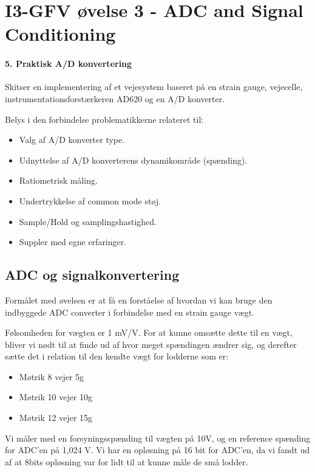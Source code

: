 \documentclass[a4paper, 11pt, articel,oneside,openany]{memoir} %
\begin{document}
	
\chapter*{I3-GFV øvelse 3 - ADC and Signal Conditioning}

\subsubsection{5. Praktisk A/D konvertering}
Skitser en implementering af et vejesystem baseret på en strain gauge, vejecelle, instrumentationsforstærkeren AD620 og en A/D konverter.

Belys i den forbindelse problematikkerne relateret til:
\begin{itemize}
	\item Valg af A/D konverter type.
	\item Udnyttelse af A/D konverterens dynamikområde (spænding).
	\item Ratiometrisk måling.
	\item Undertrykkelse af common mode støj.
	\item Sample/Hold og samplingshastighed.
	\item Suppler med egne erfaringer.
\end{itemize}




\section{ADC og signalkonvertering}

Formålet med øvelsen er at få en forståelse af hvordan vi kan bruge den indbyggede ADC converter i forbindelse med en strain gauge vægt.

Følsomheden for vægten er 1 mV/V. For at kunne omsætte dette til en vægt, bliver vi nødt til at finde ud af hvor meget spændingen ændrer sig, og derefter sætte det i relation til den kendte vægt for lodderne som er:

\begin{itemize}

	\item Møtrik 8 vejer 5g
	\item Møtrik 10 vejer 10g
	\item Møtrik 12 vejer 15g
	
\end{itemize}


Vi måler med en forsyningsspænding til vægten på 10V, og en reference spænding for ADC'en på 1,024 V.
Vi har en opløsning på 16 bit for ADC'en, da vi fandt ud af at 8bits opløsning var for lidt til at kunne måle de små lodder.
\end{document}
